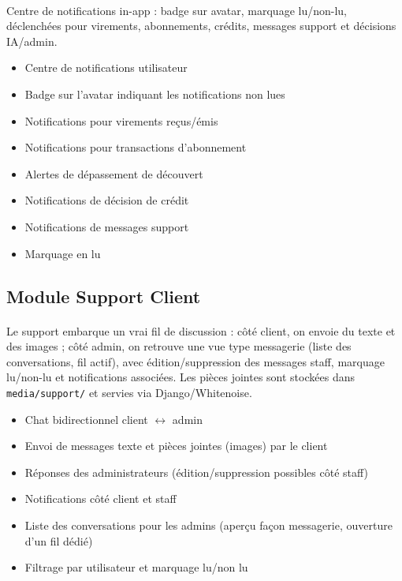 \documentclass[12pt,a4paper]{report}
\begin{document}
\paragraph{}Centre de notifications in-app : badge sur avatar, marquage lu/non-lu, déclenchées pour virements, abonnements, crédits, messages support et décisions IA/admin.
\begin{itemize}[leftmargin=1.5cm]
    \item Centre de notifications utilisateur
    \item Badge sur l'avatar indiquant les notifications non lues
    \item Notifications pour virements reçus/émis
    \item Notifications pour transactions d'abonnement
    \item Alertes de dépassement de découvert
    \item Notifications de décision de crédit
    \item Notifications de messages support
    \item Marquage en lu
\end{itemize}

\subsection{Module Support Client}
\paragraph{}Le support embarque un vrai fil de discussion : côté client, on envoie du texte et des images ; côté admin, on retrouve une vue type messagerie (liste des conversations, fil actif), avec édition/suppression des messages staff, marquage lu/non-lu et notifications associées. Les pièces jointes sont stockées dans \texttt{media/support/} et servies via Django/Whitenoise.
\begin{itemize}[leftmargin=1.5cm]
    \item Chat bidirectionnel client $\leftrightarrow$ admin
    \item Envoi de messages texte et pièces jointes (images) par le client
    \item Réponses des administrateurs (édition/suppression possibles côté staff)
    \item Notifications côté client et staff
    \item Liste des conversations pour les admins (aperçu façon messagerie, ouverture d'un fil dédié)
    \item Filtrage par utilisateur et marquage lu/non lu
\end{itemize}
\end{document}
